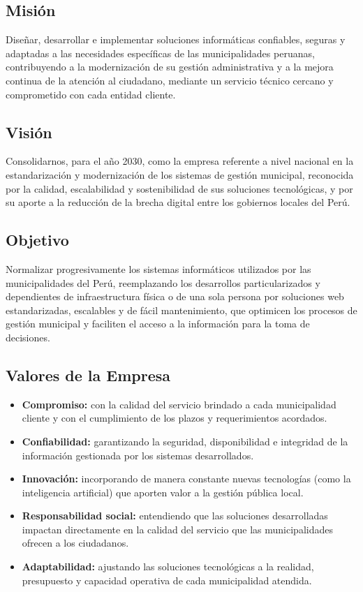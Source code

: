\documentclass[12pt,a4paper]{report}
\begin{document}
\subsection{Misión}
Diseñar, desarrollar e implementar soluciones informáticas confiables, seguras y adaptadas a las necesidades específicas de las municipalidades peruanas, contribuyendo a la modernización de su gestión administrativa y a la mejora continua de la atención al ciudadano, mediante un servicio técnico cercano y comprometido con cada entidad cliente.

\subsection{Visión}
Consolidarnos, para el año 2030, como la empresa referente a nivel nacional en la estandarización y modernización de los sistemas de gestión municipal, reconocida por la calidad, escalabilidad y sostenibilidad de sus soluciones tecnológicas, y por su aporte a la reducción de la brecha digital entre los gobiernos locales del Perú.

\subsection{Objetivo}
Normalizar progresivamente los sistemas informáticos utilizados por las municipalidades del Perú, reemplazando los desarrollos particularizados y dependientes de infraestructura física o de una sola persona por soluciones web estandarizadas, escalables y de fácil mantenimiento, que optimicen los procesos de gestión municipal y faciliten el acceso a la información para la toma de decisiones.

\subsection{Valores de la Empresa}

\begin{itemize}
  \item \textbf{Compromiso:} con la calidad del servicio brindado a cada municipalidad cliente y con el cumplimiento de los plazos y requerimientos acordados.
  \item \textbf{Confiabilidad:} garantizando la seguridad, disponibilidad e integridad de la información gestionada por los sistemas desarrollados.
  \item \textbf{Innovación:} incorporando de manera constante nuevas tecnologías (como la inteligencia artificial) que aporten valor a la gestión pública local.
  \item \textbf{Responsabilidad social:} entendiendo que las soluciones desarrolladas impactan directamente en la calidad del servicio que las municipalidades ofrecen a los ciudadanos.
  \item \textbf{Adaptabilidad:} ajustando las soluciones tecnológicas a la realidad, presupuesto y capacidad operativa de cada municipalidad atendida.
\end{itemize}
\end{document}
